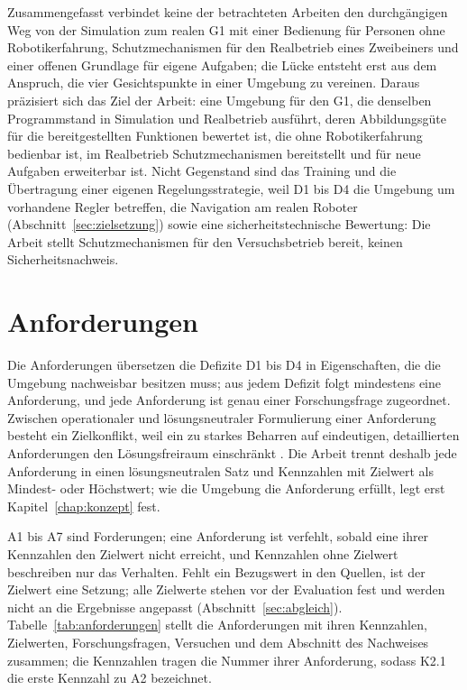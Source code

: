 Zusammengefasst verbindet keine der betrachteten Arbeiten den durchgängigen Weg von der Simulation zum realen G1 mit einer Bedienung für Personen ohne Robotikerfahrung, Schutzmechanismen für den Realbetrieb eines Zweibeiners und einer offenen Grundlage für eigene Aufgaben; die Lücke entsteht erst aus dem Anspruch, die vier Gesichtspunkte in einer Umgebung zu vereinen.
Daraus präzisiert sich das Ziel der Arbeit: eine Umgebung für den G1, die denselben Programmstand in Simulation und Realbetrieb ausführt, deren Abbildungsgüte für die bereitgestellten Funktionen bewertet ist, die ohne Robotikerfahrung bedienbar ist, im Realbetrieb Schutzmechanismen bereitstellt und für neue Aufgaben erweiterbar ist.
Nicht Gegenstand sind das Training und die Übertragung einer eigenen Regelungsstrategie, weil D1 bis D4 die Umgebung um vorhandene Regler betreffen, die Navigation am realen Roboter (Abschnitt~\ref{sec:zielsetzung}) sowie eine sicherheitstechnische Bewertung: Die Arbeit stellt Schutzmechanismen für den Versuchsbetrieb bereit, keinen Sicherheitsnachweis.

\section{Anforderungen}
\label{sec:anforderungen}
Die Anforderungen übersetzen die Defizite D1 bis D4 in Eigenschaften, die die Umgebung nachweisbar besitzen muss; aus jedem Defizit folgt mindestens eine Anforderung, und jede Anforderung ist genau einer Forschungsfrage zugeordnet.
Zwischen operationaler und lösungsneutraler Formulierung einer Anforderung besteht ein Zielkonflikt, weil ein zu starkes Beharren auf eindeutigen, detaillierten Anforderungen den Lösungsfreiraum einschränkt \cite{Bender2021}.
Die Arbeit trennt deshalb jede Anforderung in einen lösungsneutralen Satz und Kennzahlen mit Zielwert als Mindest- oder Höchstwert; wie die Umgebung die Anforderung erfüllt, legt erst Kapitel~\ref{chap:konzept} fest.

A1 bis A7 sind Forderungen; eine Anforderung ist verfehlt, sobald eine ihrer Kennzahlen den Zielwert nicht erreicht, und Kennzahlen ohne Zielwert beschreiben nur das Verhalten.
Fehlt ein Bezugswert in den Quellen, ist der Zielwert eine Setzung; alle Zielwerte stehen vor der Evaluation fest und werden nicht an die Ergebnisse angepasst (Abschnitt~\ref{sec:abgleich}).
Tabelle~\ref{tab:anforderungen} stellt die Anforderungen mit ihren Kennzahlen, Zielwerten, Forschungsfragen, Versuchen und dem Abschnitt des Nachweises zusammen; die Kennzahlen tragen die Nummer ihrer Anforderung, sodass K2.1 die erste Kennzahl zu A2 bezeichnet.

